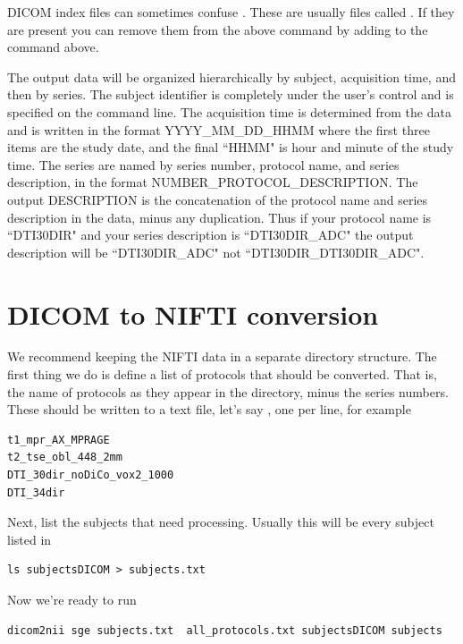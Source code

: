 \documentclass{InsightArticle}
\begin{document}
DICOM index files can sometimes confuse . These are usually files called . If they are present you can remove them from the above command by adding  to the  command above.

The output data will be organized hierarchically by subject, acquisition time, and then by series. The subject identifier is completely under the user's control and is specified on the command line. The acquisition time is determined from the data and is written in the format YYYY\_MM\_DD\_HHMM where the first three items are the study date, and the final ``HHMM" is hour and minute of the study time. The series are named by series number, protocol name, and series description, in the format NUMBER\_PROTOCOL\_DESCRIPTION. The output DESCRIPTION is the concatenation of the protocol name and series description in the data, minus any duplication. Thus if your protocol name is ``DTI30DIR" and your series description is ``DTI30DIR\_ADC" the output description will be ``DTI30DIR\_ADC" not ``DTI30DIR\_DTI30DIR\_ADC".


\section{DICOM to NIFTI conversion} \label{sec:dicom2nii}

We recommend keeping the NIFTI data in a separate directory structure. The first thing we do is define a list of protocols that should be converted. That is, the name of protocols as they appear in the  directory, minus the series numbers. These should be written to a text file, let's say , one per line, for example
\begin{lstlisting}[style=bash]
t1_mpr_AX_MPRAGE
t2_tse_obl_448_2mm
DTI_30dir_noDiCo_vox2_1000
DTI_34dir
\end{lstlisting}

Next, list the subjects that need processing. Usually this will be every subject listed in 
\begin{lstlisting}[style=bash]
  ls subjectsDICOM > subjects.txt  
\end{lstlisting}

Now we're ready to run
\begin{lstlisting}[style=bash]
 dicom2nii sge subjects.txt  all_protocols.txt subjectsDICOM subjects
\end{lstlisting}
\end{document}
